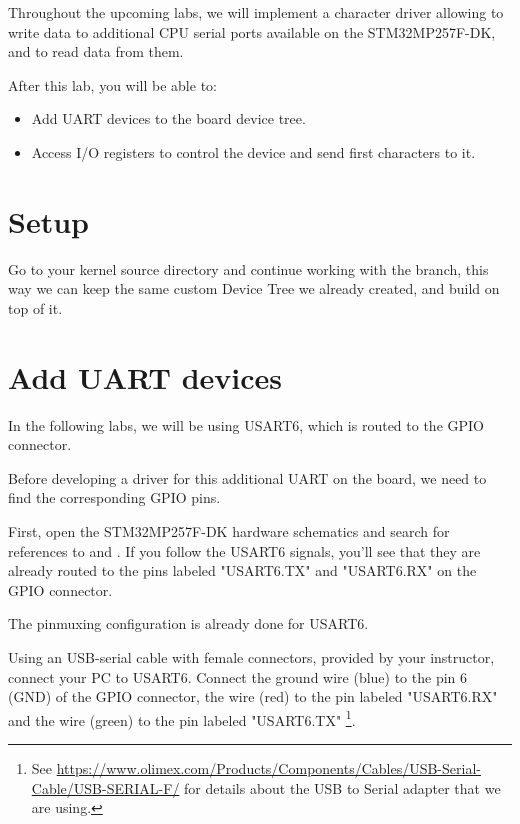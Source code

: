 
Throughout the upcoming labs, we will implement a character driver
allowing to write data to additional CPU serial ports available on
the STM32MP257F-DK, and to read data from them.

After this lab, you will be able to:

\begin{itemize}
\item Add UART devices to the board device tree.
\item Access I/O registers to control the device and
      send first characters to it.
\end{itemize}

\section{Setup}

Go to your kernel source directory and continue working with the
 branch, this way we can keep the same custom Device
Tree we already created, and build on top of it.

\section{Add UART devices}

In the following labs, we will be using USART6, which is routed to the GPIO
connector.

Before developing a driver for this additional UART on the board, we
need to find the corresponding GPIO pins.

First, open the STM32MP257F-DK hardware schematics and search for references to
 and . If you
follow the USART6 signals, you'll see that they are already routed to the pins
labeled "USART6.TX" and "USART6.RX" on the GPIO connector.

The pinmuxing configuration is already done for USART6.

Using an USB-serial cable with female connectors, provided by your
instructor, connect your PC to USART6.
Connect the ground wire (blue) to the pin 6 (GND) of the GPIO connector,
the  wire (red) to the pin labeled "USART6.RX" and the  wire (green) to
the pin labeled "USART6.TX" \footnote{See \url{https://www.olimex.com/Products/Components/Cables/USB-Serial-Cable/USB-SERIAL-F/}
for details about the USB to Serial adapter that we are using.}.

